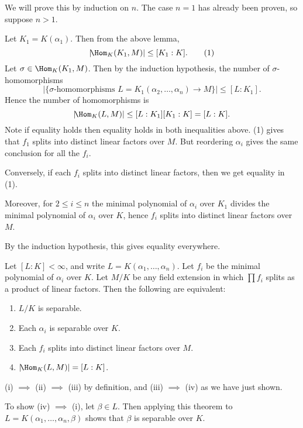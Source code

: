 \documentclass[12pt]{article}
\begin{document}
\begin{proofbox}
	We will prove this by induction on $n$. The case $n = 1$ has already been proven, so suppose $n > 1$.

	Let $K_1 = K(\alpha_1)$. Then from the above lemma,
	 \[
		 |\!\Hom_K(K_1, M)| \leq [K_1:K]. \tag{1}
	\]
	Let $\sigma \in \Hom_K(K_1,M)$. Then by the induction hypothesis, the number of $\sigma$-homomorphisms
	\[
		|\{\sigma\text{-homomorphisms } L = K_1(\alpha_2, \ldots, \alpha_n) \to M\}| \leq [L:K_1]. \tag{2}
	\]
	Hence the number of homomorphisms is
	\[
		|\!\Hom_K(L,M)| \le [L:K_1][K_1:K] = [L:K].
	\]
	Note if equality holds then equality holds in both inequalities above. (1) gives that $f_1$ splits into distinct linear factors over $M$. But reordering $\alpha_i$ gives the same conclusion for all the $f_i$.

	Conversely, if each $f_i$ splits into distinct linear factors, then we get equality in (1).

	Moreover, for $2 \leq i \leq n$ the minimal polynomial of $\alpha_i$ over $K_1$ divides the minimal polynomial of $\alpha_i$ over $K$, hence $f_i$ splits into distinct linear factors over $M$.

	By the induction hypothesis, this gives equality everywhere.
\end{proofbox}

\begin{corollary}
	Let $[L:K] < \infty$, and write $L = K(\alpha_1, \ldots, \alpha_n)$. Let $f_i$ be the minimal polynomial of $\alpha_i$ over $K$. Let $M/K$ be any field extension in which $\prod f_i$ splits as a product of linear factors. Then the following are equivalent:
	\begin{enumerate}[\normalfont(i)]
		\item $L/K$ is separable.
		\item Each $\alpha_i$ is separable over $K$.
		\item Each $f_i$ splits into distinct linear factors over $M$.
		\item $|\!\Hom_K(L,M)|=[L:K]$.
	\end{enumerate}
\end{corollary}

\begin{proofbox}
	(i) $\implies$ (ii) $\implies$ (iii) by definition, and (iii) $\implies$ (iv) as we have just shown.

	To show (iv) $\implies$ (i), let $\beta \in L$. Then applying this theorem to $L = K(\alpha_1, \ldots, \alpha_n, \beta)$ shows that $\beta$ is separable over $K$.
\end{proofbox}
\end{document}
